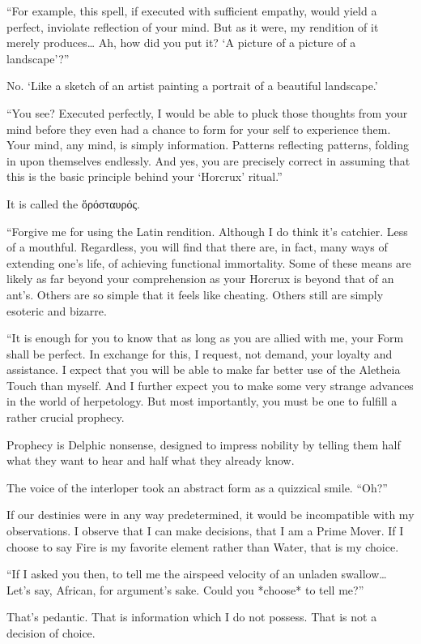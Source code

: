 “For example, this spell, if executed with sufficient empathy, would yield a perfect, inviolate reflection of your mind. But as it were, my rendition of it merely produces… Ah, how did you put it? ‘A picture of a picture of a landscape’?”

No. ‘Like a sketch of an artist painting a portrait of a beautiful landscape.’

“You see? Executed perfectly, I would be able to pluck those thoughts from your mind before they even had a chance to form for your self to experience them. Your mind, any mind, is simply information. Patterns reflecting patterns, folding in upon themselves endlessly. And yes, you are precisely correct in assuming that this is the basic principle behind your ‘Horcrux’ ritual.”

It is called the ὅρόσταυρός.

“Forgive me for using the Latin rendition. Although I do think it’s catchier. Less of a mouthful. Regardless, you will find that there are, in fact, many ways of extending one’s life, of achieving functional immortality. Some of these means are likely as far beyond your comprehension as your Horcrux is beyond that of an ant’s. Others are so simple that it feels like cheating. Others still are simply esoteric and bizarre.

“It is enough for you to know that as long as you are allied with me, your Form shall be perfect. In exchange for this, I request, not demand, your loyalty and assistance. I expect that you will be able to make far better use of the Aletheia Touch than myself. And I further expect you to make some very strange advances in the world of herpetology. But most importantly, you must be one to fulfill a rather crucial prophecy.

Prophecy is Delphic nonsense, designed to impress nobility by telling them half what they want to hear and half what they already know.

The voice of the interloper took an abstract form as a quizzical smile. “Oh?”

If our destinies were in any way predetermined, it would be incompatible with my observations. I observe that I can make decisions, that I am a Prime Mover. If I choose to say Fire is my favorite element rather than Water, that is my choice.

“If I asked you then, to tell me the airspeed velocity of an unladen swallow… Let’s say, African, for argument’s sake. Could you *choose* to tell me?”

That’s pedantic. That is information which I do not possess. That is not a decision of choice.


